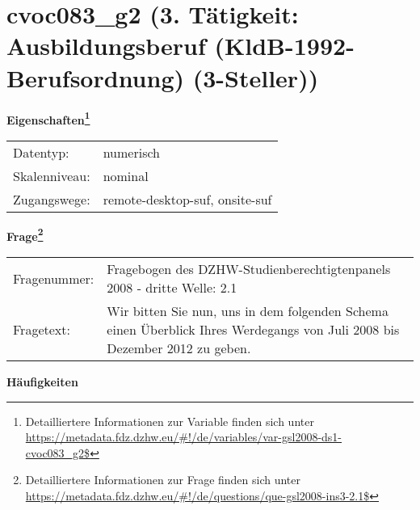 
    \setcounter{footnote}{0}

    \vspace*{-1.8cm}
	\section{cvoc083\_g2 (3. Tätigkeit: Ausbildungsberuf (KldB-1992-Berufsordnung) (3-Steller))}
	\label{section:cvoc083_g2}



    \vspace*{0.5cm}
    \noindent\textbf{Eigenschaften\footnote{Detailliertere Informationen zur Variable finden sich unter
		\url{https://metadata.fdz.dzhw.eu/\#!/de/variables/var-gsl2008-ds1-cvoc083_g2$}}}\\
	\begin{tabularx}{\hsize}{@{}lX}
	Datentyp: & numerisch \\
	Skalenniveau: & nominal \\
	Zugangswege: &
	  remote-desktop-suf, 
	  onsite-suf
 \\
    \end{tabularx}



				\vspace*{0.5cm}
                \noindent\textbf{Frage\footnote{Detailliertere Informationen zur Frage finden sich unter
		              \url{https://metadata.fdz.dzhw.eu/\#!/de/questions/que-gsl2008-ins3-2.1$}}}\\
				\begin{tabularx}{\hsize}{@{}lX}
					Fragenummer: &
					  Fragebogen des DZHW-Studienberechtigtenpanels 2008 - dritte Welle:
					  2.1
 \\
					Fragetext: & Wir bitten Sie nun, uns in dem folgenden Schema einen Überblick Ihres Werdegangs von Juli 2008 bis Dezember 2012 zu geben. \\
				\end{tabularx}





        		\vspace*{0.5cm}
                \noindent\textbf{Häufigkeiten}

